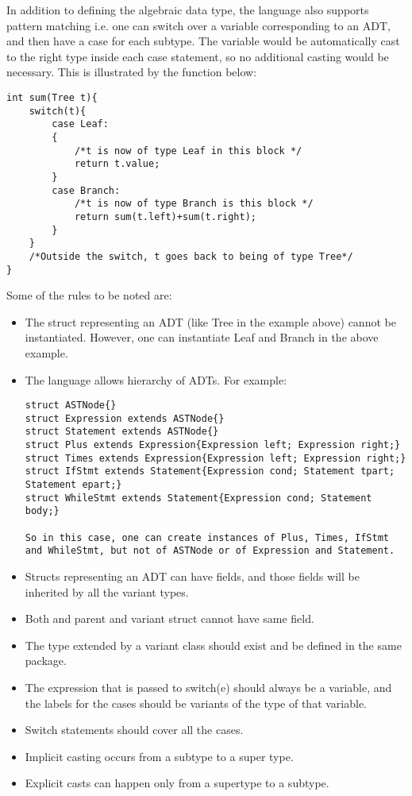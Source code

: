 In addition to defining the algebraic data type, the language also supports pattern matching i.e. one can switch over a variable corresponding to an ADT, and then have a case for each subtype. The variable would be automatically cast to the right type inside each case statement, so no additional casting would be necessary. This is illustrated by the function below:

\begin{lstlisting}
int sum(Tree t){
	switch(t){
		case Leaf:
		{
			/*t is now of type Leaf in this block */
			return t.value;
		}
		case Branch:
			/*t is now of type Branch is this block */
			return sum(t.left)+sum(t.right);
		}
	}
	/*Outside the switch, t goes back to being of type Tree*/
}
\end{lstlisting}

Some of the rules to be noted are:
\begin{itemize}
\item The struct representing an ADT (like Tree in the example above) cannot be instantiated. However, one can instantiate Leaf and Branch in the above example.
\item The language allows hierarchy of ADTs. For example:
\begin{lstlisting}
struct ASTNode{}
struct Expression extends ASTNode{}
struct Statement extends ASTNode{}
struct Plus extends Expression{Expression left; Expression right;}
struct Times extends Expression{Expression left; Expression right;}
struct IfStmt extends Statement{Expression cond; Statement tpart; Statement epart;}
struct WhileStmt extends Statement{Expression cond; Statement body;}

So in this case, one can create instances of Plus, Times, IfStmt and WhileStmt, but not of ASTNode or of Expression and Statement.
\end{lstlisting}

\item Structs representing an ADT can have fields, and those fields will be inherited by all the variant types.
\item Both and parent and variant struct cannot have same field.
\item The type extended by a variant class should exist and be defined in the same package.
\item The expression that is passed to switch(e) should always be a variable, and the labels for the cases should be variants of the type of that variable.
\item Switch statements should cover all the cases.
\item Implicit casting occurs from a subtype to a super type.
\item Explicit casts can happen only from a supertype to a subtype.
\end{itemize}



